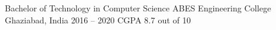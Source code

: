 
\cventry
{Bachelor of Technology in Computer Science}
{ABES Engineering College}
{Ghaziabad, India}
{2016 -- 2020}
{CGPA 8.7 out of 10}
